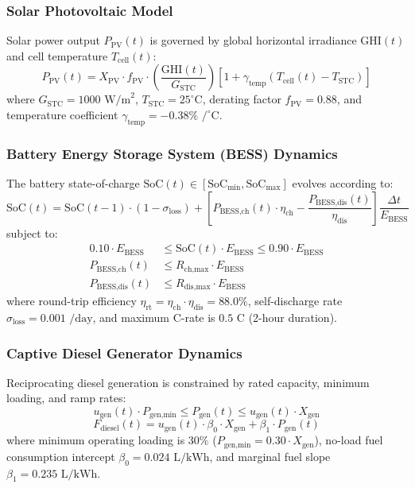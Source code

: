 \documentclass[12pt,3p,review]{elsarticle}
\begin{document}
\subsubsection{Solar Photovoltaic Model}
Solar power output $P_{\text{PV}}(t)$ is governed by global horizontal irradiance $\text{GHI}(t)$ and cell temperature $T_{\text{cell}}(t)$:
\begin{equation}
    P_{\text{PV}}(t) = X_{\text{PV}} \cdot f_{\text{PV}} \cdot \left(\frac{\text{GHI}(t)}{G_{\text{STC}}}\right) \left[ 1 + \gamma_{\text{temp}} \left( T_{\text{cell}}(t) - T_{\text{STC}} \right) \right]
    \label{eq:pv}
\end{equation}
where $G_{\text{STC}} = 1000\text{ W/m}^2$, $T_{\text{STC}} = 25^\circ\text{C}$, derating factor $f_{\text{PV}} = 0.88$, and temperature coefficient $\gamma_{\text{temp}} = -0.38\%\text{ /}^\circ\text{C}$.

\subsubsection{Battery Energy Storage System (BESS) Dynamics}
The battery state-of-charge $\text{SoC}(t) \in [\text{SoC}_{\min}, \text{SoC}_{\max}]$ evolves according to:
\begin{equation}
    \text{SoC}(t) = \text{SoC}(t-1) \cdot (1 - \sigma_{\text{loss}}) + \left[ P_{\text{BESS,ch}}(t) \cdot \eta_{\text{ch}} - \frac{P_{\text{BESS,dis}}(t)}{\eta_{\text{dis}}} \right] \frac{\Delta t}{E_{\text{BESS}}}
    \label{eq:bess}
\end{equation}
subject to:
\begin{align}
    0.10 \cdot E_{\text{BESS}} &\le \text{SoC}(t) \cdot E_{\text{BESS}} \le 0.90 \cdot E_{\text{BESS}} \\
    P_{\text{BESS,ch}}(t) &\le R_{\text{ch,max}} \cdot E_{\text{BESS}} \\
    P_{\text{BESS,dis}}(t) &\le R_{\text{dis,max}} \cdot E_{\text{BESS}}
\end{align}
where round-trip efficiency $\eta_{\text{rt}} = \eta_{\text{ch}} \cdot \eta_{\text{dis}} = 88.0\%$, self-discharge rate $\sigma_{\text{loss}} = 0.001\text{ /day}$, and maximum C-rate is $0.5\text{ C}$ (2-hour duration).

\subsubsection{Captive Diesel Generator Dynamics}
Reciprocating diesel generation is constrained by rated capacity, minimum loading, and ramp rates:
\begin{equation}
    u_{\text{gen}}(t) \cdot P_{\text{gen,min}} \le P_{\text{gen}}(t) \le u_{\text{gen}}(t) \cdot X_{\text{gen}}
\end{equation}
\begin{equation}
    F_{\text{diesel}}(t) = u_{\text{gen}}(t) \cdot \beta_0 \cdot X_{\text{gen}} + \beta_1 \cdot P_{\text{gen}}(t)
\end{equation}
where minimum operating loading is $30\%$ ($P_{\text{gen,min}} = 0.30 \cdot X_{\text{gen}}$), no-load fuel consumption intercept $\beta_0 = 0.024\text{ L/kWh}$, and marginal fuel slope $\beta_1 = 0.235\text{ L/kWh}$.
\end{document}
